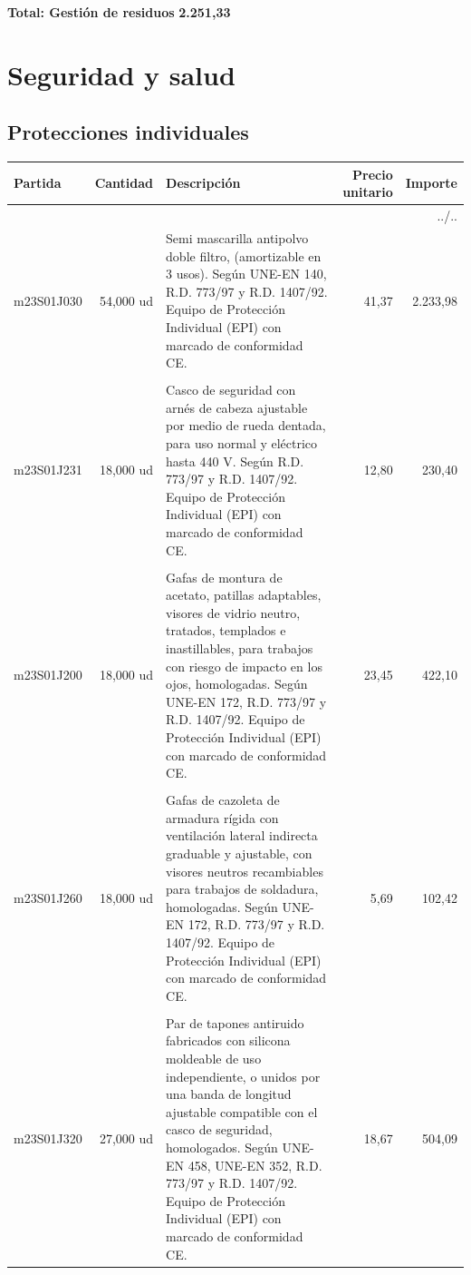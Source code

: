 \documentclass{book}%
\begin{document}
%
\noindent%
\large%
\textbf{Total: Gestión de residuos }%
\dotfill%
\textbf{2.251,33}%
\newline%
\normalsize

%
\section{Seguridad y salud}%
\subsection{Protecciones individuales}%
\small%
\begin{longtable}{lrlrr}%
Partida&Cantidad&Descripción&\multicolumn{1}{p{1.5cm}}{Precio unitario}&Importe\\%
\hline%
\endhead%
\multicolumn{5}{r}{../..}\\%
\endfoot%
\hline%
\endlastfoot%
m23S01J030&    54,000 ud&\multicolumn{1}{p{5cm}}{Semi mascarilla antipolvo doble filtro, (amortizable en 3 usos). Según UNE{-}EN 140, R.D. 773/97 y R.D. 1407/92. Equipo de Protección Individual (EPI) con marcado de conformidad CE.}&     41,37&2.233,98\\%
&&&&\\%
m23S01J231&    18,000 ud&\multicolumn{1}{p{5cm}}{Casco de seguridad con arnés de cabeza ajustable por medio de rueda dentada, para uso normal y eléctrico hasta 440 V. Según R.D. 773/97 y R.D. 1407/92. Equipo de Protección Individual (EPI) con marcado de conformidad CE.}&     12,80&230,40\\%
&&&&\\%
m23S01J200&    18,000 ud&\multicolumn{1}{p{5cm}}{Gafas de montura de acetato, patillas adaptables, visores de vidrio neutro, tratados, templados e inastillables, para trabajos con riesgo de impacto en los ojos, homologadas. Según UNE{-}EN 172, R.D. 773/97 y R.D. 1407/92. Equipo de Protección Individual (EPI) con marcado de conformidad CE.}&     23,45&422,10\\%
&&&&\\%
m23S01J260&    18,000 ud&\multicolumn{1}{p{5cm}}{Gafas de cazoleta de armadura rígida con ventilación lateral indirecta graduable y ajustable, con visores neutros recambiables para trabajos de soldadura, homologadas. Según UNE{-}EN 172, R.D. 773/97 y R.D. 1407/92. Equipo de Protección Individual (EPI) con marcado de conformidad CE.}&      5,69&102,42\\%
&&&&\\%
m23S01J320&    27,000 ud&\multicolumn{1}{p{5cm}}{Par de tapones antiruido fabricados con silicona moldeable de uso independiente, o unidos por una banda de longitud ajustable compatible con el casco de seguridad, homologados. Según UNE{-}EN 458, UNE{-}EN 352, R.D. 773/97 y R.D. 1407/92. Equipo de Protección Individual (EPI) con marcado de conformidad CE.}&     18,67&504,09\\%

\end{longtable}
\end{document}
